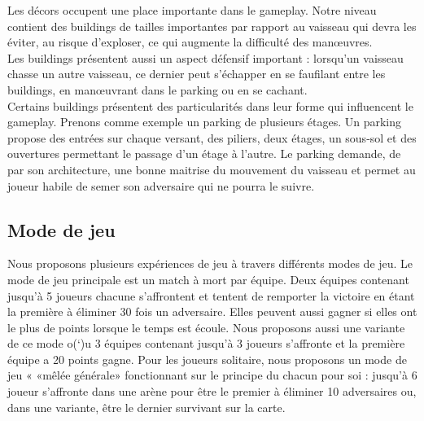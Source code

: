 \documentclass[12pt, titlepage]{article}
\begin{document}
\begin{spacing}{1.5}
Les décors occupent une place importante dans le gameplay. Notre niveau contient des buildings de tailles importantes par rapport au vaisseau qui devra les éviter, au risque d'exploser, ce qui augmente la difficulté des manœuvres.\\

Les buildings présentent aussi un aspect défensif important : lorsqu'un vaisseau chasse un autre vaisseau, ce dernier peut s'échapper en se faufilant entre les buildings, en manœuvrant dans le parking ou en se cachant. \\

Certains buildings présentent des particularités dans leur forme qui influencent le gameplay. Prenons comme exemple un parking de plusieurs étages. Un parking propose des entrées sur chaque versant, des piliers, deux étages, un sous-sol et des ouvertures permettant le passage d'un étage à l'autre. Le parking demande, de par son architecture, une bonne maitrise du mouvement du vaisseau et permet au joueur habile de semer son adversaire qui ne pourra le suivre. \\

\subsection{Mode de jeu}

Nous proposons plusieurs expériences de jeu à travers différents modes de jeu. Le mode de jeu principale est un match à mort par équipe. Deux équipes contenant jusqu'à 5 joueurs chacune s'affrontent et tentent de remporter la victoire en étant la première à éliminer 30 fois un adversaire. Elles peuvent aussi gagner si elles ont le plus de points lorsque le temps est écoule. Nous proposons aussi une variante de ce mode o(‘)u 3 équipes contenant jusqu'à 3 joueurs s'affronte et la première équipe a 20 points gagne. Pour les joueurs solitaire, nous proposons un mode de jeu « «mêlée générale» fonctionnant sur le principe du chacun pour soi : jusqu'à 6 joueur s'affronte dans une arène pour être le premier à éliminer 10 adversaires ou, dans une variante, être le dernier survivant sur la carte. \\


\end{spacing}
\end{document}
